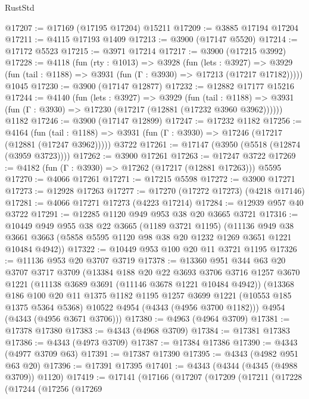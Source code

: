 \begin{lexlean}{RustStd}
\begin{coremodule}
@17207 := @17169 (@17195 @17204) @15211
@17209 := @3885 @17194 @17204
@17211 := @4115 @17193 @1409
@17213 := @3900 (@17147 @5520)
@17214 := @17172 @5523
@17215 := @3971 @17214
@17217 := @3900 (@17215 @3992)
@17228 := @4118
    (fun (rty : @1013) =>
    @3928
      (fun (lets : @3927) =>
      @3929 (fun (tail : @1188) => @3931 (fun (Γ : @3930) => @17213 (@17217 @17182)))))
    @1045
@17230 := @3900 (@17147 @12877)
@17232 := @12882 @17177 @15216
@17244 := @4140
    (fun (lets : @3927) =>
    @3929
      (fun (tail : @1188) =>
      @3931 (fun (Γ : @3930) => @17230 (@17217 (@12881 (@17232 @3960 @3962))))))
    @1182
@17246 := @3900 (@17147 @12899)
@17247 := @17232 @1182
@17256 := @4164
    (fun (tail : @1188) => @3931 (fun (Γ : @3930) => @17246 (@17217 (@12881 (@17247 @3962)))))
    @3722
@17261 := @17147 (@3950 (@5518 (@12874 (@3959 @3723))))
@17262 := @3900 @17261
@17263 := @17247 @3722
@17269 := @4182 (fun (Γ : @3930) => @17262 (@17217 (@12881 @17263))) @5595
@17270 := @4066 @17261
@17271 := @17215 @5598
@17272 := @3900 @17271
@17273 := @12928 @17263
@17277 := @17270 (@17272 @17273) (@4218 @17146)
@17281 := @4066 @17271 @17273 (@4223 @17214)
@17284 := @12939 @957 @40 @3722
@17291 := @12285 @1120 @949 @953 @38 @20 @3665 @3721
@17316 := @10449
    @949
    @955
    @38
    @22
    @3665
    (@1189 @3721 @1195)
    (@11136
      @949
      @38
      @3661
      @3663
      (@5858 @5595 @1120 @98 @38 @20 @1232 @1269 @3651 @1221 @10484 @4942))
@17322 := @10449 @953 @100 @20 @11 @3721 @1195
@17326 := @11136 @953 @20 @3707 @3719
@17378 := @13360
    @951
    @344
    @63
    @20
    @3707
    @3717
    @3709
    (@13384
      @188
      @20
      @22
      @3693
      @3706
      @3716
      @1257
      @3670
      @1221
      (@11138 @3689 @3691 (@11146 @3678 @1221 @10484 @4942))
      (@13368
        @186
        @100
        @20
        @11
        @1375
        @1182
        @1195
        @1257
        @3699
        @1221
        (@10553 @185 @1375 @5364 @5368)
        @10522
        @4954
        (@4343 (@4956 @3700 @1182)))
      @4954
      (@4343 (@4956 @3671 @3706)))
@17380 := @4963 (@4964 @3709)
@17381 := @17378 @17380
@17383 := @4343 (@4968 @3709)
@17384 := @17381 @17383
@17386 := @4343 (@4973 @3709)
@17387 := @17384 @17386
@17390 := @4343 (@4977 @3709 @63)
@17391 := @17387 @17390
@17395 := @4343 (@4982 @951 @63 @20)
@17396 := @17391 @17395
@17401 := @4343 (@4344 (@4345 (@4988 @3709)) @1120)
@17419 := @17141
    (@17166
      (@17207
        (@17209
          (@17211
            (@17228
              (@17244
                (@17256
                  (@17269

\end{coremodule}
\end{lexlean}
